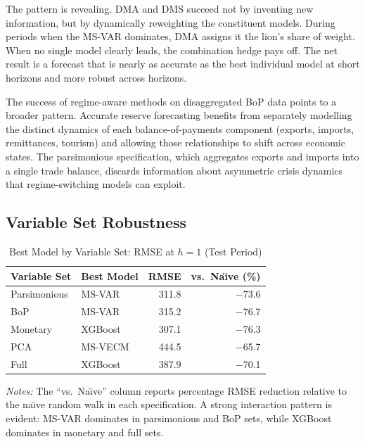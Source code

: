 \documentclass[12pt,a4paper]{article}
\begin{document}
The pattern is revealing. DMA and DMS succeed not by inventing new information, but by dynamically reweighting the constituent models. During periods when the MS-VAR dominates, DMA assigns it the lion's share of weight. When no single model clearly leads, the combination hedge pays off. The net result is a forecast that is nearly as accurate as the best individual model at short horizons and more robust across horizons.

The success of regime-aware methods on disaggregated BoP data points to a broader pattern. Accurate reserve forecasting benefits from separately modelling the distinct dynamics of each balance-of-payments component (exports, imports, remittances, tourism) and allowing those relationships to shift across economic states. The parsimonious specification, which aggregates exports and imports into a single trade balance, discards information about asymmetric crisis dynamics that regime-switching models can exploit.

\subsection{Variable Set Robustness}

\begin{table}[htbp]
\centering
\caption{Best Model by Variable Set: RMSE at $h = 1$ (Test Period)}
\label{tab:best_by_varset}
\begin{tabular}{llrr}
\toprule
Variable Set & Best Model & RMSE & vs.\ Na\"{\i}ve (\%) \\
\midrule
Parsimonious & MS-VAR & 311.8 & $-$73.6 \\
BoP & MS-VAR & 315.2 & $-$76.7 \\
Monetary & XGBoost & 307.1 & $-$76.3 \\
PCA & MS-VECM & 444.5 & $-$65.7 \\
Full & XGBoost & 387.9 & $-$70.1 \\
\bottomrule
\end{tabular}
\begin{tablenotes}
\small
\item \textit{Notes:} The ``vs.\ Na\"{\i}ve'' column reports percentage RMSE reduction relative to the na\"{\i}ve random walk in each specification. A strong interaction pattern is evident: MS-VAR dominates in parsimonious and BoP sets, while XGBoost dominates in monetary and full sets.
\end{tablenotes}
\end{table}
\end{document}
